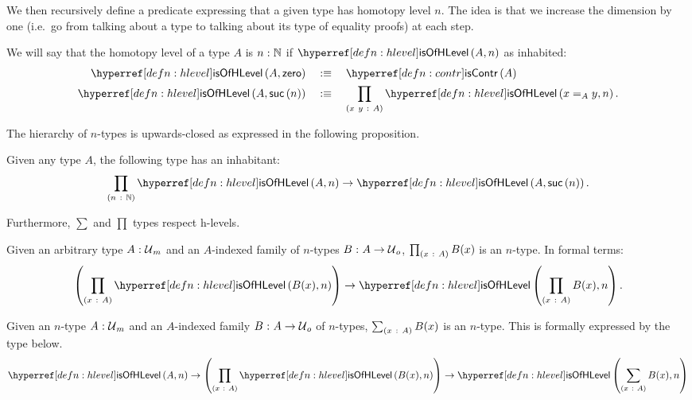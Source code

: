 We then recursively define a predicate expressing that a given type has homotopy level
$n$. The idea is that we increase the dimension by one (i.e.~go from talking about a type
to talking about its type of equality proofs) at each step.
\begin{defn}\label{defn:hlevel}
  We will say that the homotopy level of a type $A$ is $n\hspace{0.1mm}:\hspace{0.1mm}\mathbb{N}$ if
  $\isofhlevel{A}{n}$ as inhabited:
  \begin{align*}
    \isofhlevel{A}{\zero{}} &\quad\is\quad \iscontr{A}\\
    \isofhlevel{A}{\suc{n}} &\quad\is\quad \pity{x~y}{A}{\isofhlevel{x =_A y}{n}}.
  \end{align*}
\end{defn}

The hierarchy of $n$-types is upwards-closed as expressed in the following proposition.
\begin{prop}\label{prop:level-up}
  Given any type $A$, the following type has an inhabitant:
  \begin{equation*}
    \pity{n}{\mathbb{N}}{\isofhlevel{A}{n} \rightarrow \isofhlevel{A}{\suc{n}}}.
  \end{equation*}
\end{prop}

Furthermore, $\sum$ and $\prod$ types respect h-levels.
\begin{prop}\label{prop:is-of-level-pi}
  Given an arbitrary type $A\hspace{0.1mm}:\hspace{0.1mm}\mathcal{U}{}_m$ and an $A$-indexed family of $n$-types
  $B\hspace{0.1mm}:\hspace{0.1mm}A \rightarrow \mathcal{U}{}_o$, $\prod_{(x~:~A)} B(x)$ is an $n$-type. In formal
  terms:
  \begin{equation*}
    \left( \pity{x}{A}{\isofhlevel{B(x)}{n}} \right)
      \rightarrow \isofhlevel{\pity{x}{A}{B(x)}}{n}.
  \end{equation*}
\end{prop}

\begin{prop}\label{prop:is-of-level-sigma}
  Given an $n$-type $A\hspace{0.1mm}:\hspace{0.1mm}\mathcal{U}{}_m$ and an $A$-indexed family
  $B\hspace{0.1mm}:\hspace{0.1mm}A \rightarrow \mathcal{U}{}_o$ of $n$-types, $\sum_{(x~:~A)} B(x)$ is an $n$-type.
  This is formally expressed by the type below.
  \begin{equation*}
      \isofhlevel{A}{n}
    \rightarrow \left( \pity{x}{A}{\isofhlevel{B(x)}{n}} \right)
    \rightarrow \isofhlevel{\sigmaty{x}{A}{B(x)}}{n}
  \end{equation*}
\end{prop}

